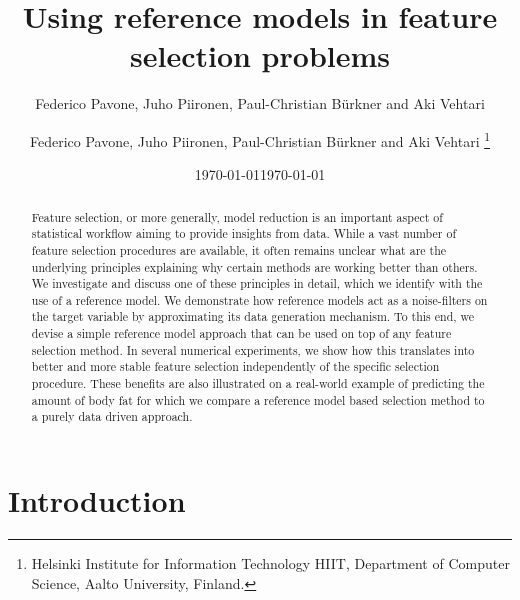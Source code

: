 \documentclass[american,]{article}
\title{Using reference models in feature selection problems 
	\vspace{.1in}}
\author{Federico Pavone, Juho Piironen, Paul-Christian B\"{u}rkner and Aki Vehtari}
\author{
    Federico Pavone, 
  Juho Piironen,
  Paul-Christian B\"{u}rkner
  and Aki Vehtari \footnote{Helsinki Institute for Information Technology HIIT,
  Department of Computer Science, Aalto University, Finland.}
  }
\date{\today}
\date{\today}
\theoremstyle{definition}
\begin{document}
\maketitle
\begin{abstract}
Feature selection, or more generally, model reduction is an important aspect of statistical workflow aiming to provide insights from data. While a vast number of feature selection procedures are available, it often remains unclear what are the underlying principles explaining why certain methods are working better than others. We investigate and discuss one of these principles in detail, which we identify with the use of a reference model. We demonstrate how reference models act as a noise-filters on the target variable by approximating its data generation mechanism.
To this end, we devise a simple reference model approach that can be used on top of any feature selection method. In several numerical experiments, we show how this translates into better and more stable feature selection independently of the specific selection procedure. 
These benefits are also illustrated on a real-world example of predicting the amount of body fat for which we compare a reference model based selection method to a purely data driven approach.



\end{abstract}

\hypertarget{introduction}{%
\section{Introduction}\label{introduction}}
\end{document}
